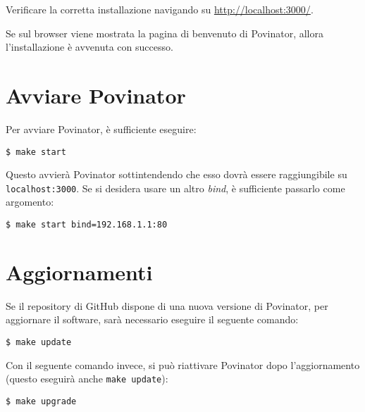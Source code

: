 \documentclass[12pt]{report}
\begin{document}
Verificare la corretta installazione navigando su
\url{http://localhost:3000/}.

Se sul browser viene mostrata la pagina di benvenuto di Povinator,
allora l'installazione è avvenuta con successo.

\section{Avviare Povinator}

Per avviare Povinator, è sufficiente eseguire:

\begin{verbatim}
$ make start
\end{verbatim}

Questo avvierà Povinator sottintendendo che esso dovrà essere raggiungibile su \texttt{localhost:3000}.
Se si desidera usare un altro \emph{bind}, è sufficiente passarlo come argomento:

\begin{verbatim}
$ make start bind=192.168.1.1:80
\end{verbatim}


\section{Aggiornamenti}

Se il repository di GitHub dispone di una nuova versione di Povinator, per aggiornare il software, sarà necessario eseguire il seguente comando:

\begin{verbatim}
$ make update
\end{verbatim}

Con il seguente comando invece, si può riattivare Povinator dopo l'aggiornamento (questo eseguirà anche \texttt{make update}):

\begin{verbatim}
$ make upgrade
\end{verbatim}
\end{document}
